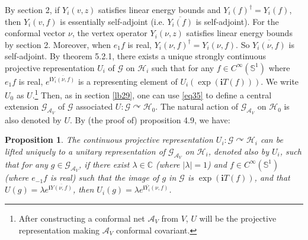 \documentclass[11pt,b5paper,notitlepage]{article}
\theoremstyle{definition}
\theoremstyle{plain}
\newtheorem{pp}[df]{Proposition}
\newcommand{\mc}{\mathcal}
\newcommand{\ovl}{\overline}
\newcommand{\GAV}{\mathscr G_{\mathcal A_V}}
\newcommand{\scr}{\mathscr}
\newcommand{\im}{\mathbf{i}}
\newcommand{\mbb}{\mathbb}
\numberwithin{equation}{subsection}
\begin{document}
By \cite{TL99} section 2, if $Y_i(v,z)$ satisfies linear energy bounds and $Y_i(f)^\dagger=Y_i(f)$, then $Y_i(v,f)$ is essentially self-adjoint (i.e. $\ovl{Y_i(f)}$ is self-adjoint). For the conformal vector $\nu$, the vertex operator $Y_i(\nu,z)$ satisfies linear energy bounds by \cite{BS90} section 2. Moreover, when $e_1f$ is real, $Y_i(\nu,f)^\dagger=Y_i(\nu,f)$. So $\ovl{Y_i(\nu,f)}$ is self-adjoint. By \cite{TL99} theorem 5.2.1, there exists a unique strongly continuous projective representation $U_i$ of $\scr G$ on $\mc H_i$ such that for any $f\in C^\infty(\mbb S^1)$ where $e_1f$ is real, $e^{\im\ovl{Y_i(\nu,f)}}$ is a representing element of $U_i(\exp(\im T(f)))$. We write $U_0$ as $U$.\footnote{After constructing a conformal net $\mc A_V$ from $V$, $U$ will be the projective representation making $\mc A_V$ conformal covariant.} Then, as in section \ref{lb29}, one can use  \eqref{eq35} to define  a central extension $\GAV$ of $\scr G$ associated $U:\scr G\curvearrowright\mc H_0$. The natural action of $\GAV$ on $\mc H_0$ is also denoted by $U$.  By (the proof of) \cite{Gui21a} proposition 4.9, we have:

\begin{pp}\label{lb46}
The continuous projective representation $U_i:\scr G\curvearrowright\mc H_i$ can be lifted uniquely to a  unitary representation  of $\GAV$ on $\mc H_i$, denoted also by $U_i$,  such that for any $g\in\GAV$, if there exist $\lambda\in\mbb C$ (where $|\lambda|=1$) and   $f\in C^\infty(\mbb S^1)$ (where $e_{-1}f$ is real) such that the image of $g$ in $\scr G$ is $\exp(\im T(f))$,  and that $U(g)=\lambda e^{\im \ovl{Y(\nu,f)}}$, then $U_i(g)=\lambda e^{\im\ovl{Y_i}(\nu,f)}$.
\end{pp}
\end{document}
